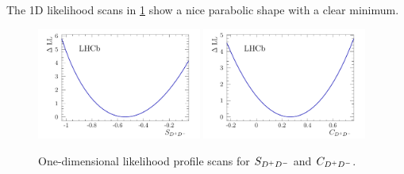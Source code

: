 The 1D likelihood scans in \cref{fig:b02dd:decaytimefit:1DLLScan} show a nice
parabolic shape with a clear minimum.
\begin{figure}[htb]
\centering
\includegraphics[width=0.48\textwidth]{07-B02DD/tikz/pdf/Likelihoodscan_sin2b.pdf}
\includegraphics[width=0.48\textwidth]{07-B02DD/tikz/pdf/Likelihoodscan_C.pdf}
\caption{One-dimensional likelihood profile scans for $S_{{{D}^+}{{D}^-}}$ and $C_{{{D}^+}{{D}^-}}$.}
\label{fig:b02dd:decaytimefit:1DLLScan}
\end{figure}

